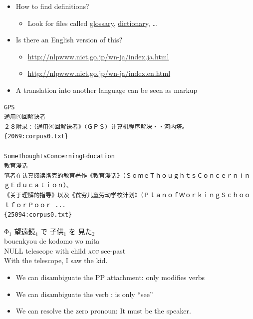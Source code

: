 \documentclass[a4paper,landscape,headrule,footrule,xetex]{foils}
\begin{document}
 \begin{itemize}
 \item How to find definitions?
   \begin{itemize}
   \item Look for files called \url{glossary}, \url{dictionary}, \ldots
   \end{itemize}
 \item Is there an English version of this?
   \begin{itemize}
   \item \url{http://nlpwww.nict.go.jp/wn-ja/index.ja.html}
   \item \url{http://nlpwww.nict.go.jp/wn-ja/index.en.html}
   \end{itemize}
 \end{itemize}


 \begin{itemize}
 \item A translation into another language can be seen as markup
 \end{itemize}

\begin{verbatim}
GPS	
通用④回解诀者
２８附录：（通用④回解诀者》（ＧＰＳ）计算机程序解决・・河内塔。
{2069:corpus0.txt}

SomeThoughtsConcerningEducation	
教育漫话
笔者在认真阅读洛克的教育著作《教育漫话》（ＳｏｍｅＴｈｏｕｇｈｔｓＣｏｎｃｅｒｎｉｎｇＥｄｕｃａｔｉｏｎ）、
《关于理解的指导》以及《贫穷儿童劳动学校计划》（ＰｌａｎｏｆＷｏｒｋｉｎｇＳｃｈｏｏｌｆｏｒＰｏｏｒ ...
{25094:corpus0.txt}
\end{verbatim}


\begin{exe}
  \ex {}
  \ex \glll Φ$_1$ 望遠鏡$_4$ で 子供$_1$ を 見た$_2$ \\
  {} bouenkyou de kodomo wo mita \\
 NULL telescope with child \textsc{acc} see-past \\
 \trans With the telescope, I saw the kid.
\end{exe}
\begin{itemize}
\item We can disambiguate the PP attachment:  only modifies verbs
\item We can disambiguate the verb :  is only ``see''
\item We can resolve the zero pronoun: It must be the speaker. 
\end{itemize}
\end{document}
